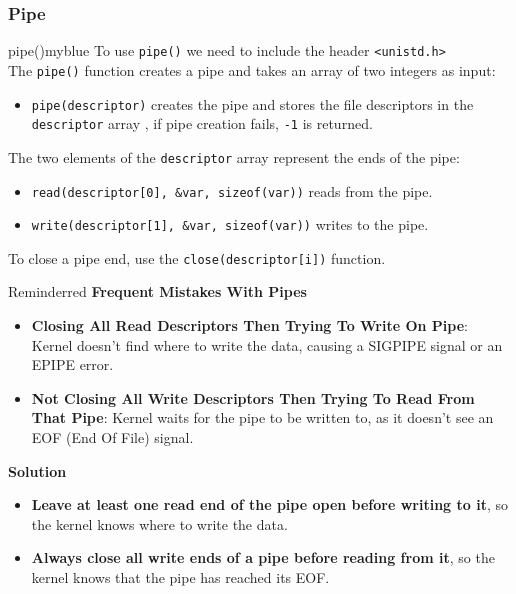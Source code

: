 \newpage
\null


\vspace{0.35cm}
\subsubsection{Pipe}
\begin{prettyBox}{pipe()}{myblue}
To use \texttt{pipe()} we need to include the header \texttt{<unistd.h>}\\
    The \texttt{pipe()} function creates a pipe and takes an array of two integers as input:
    \begin{itemize}
        \item \texttt{pipe(descriptor)} creates the pipe and stores the file descriptors in the \texttt{descriptor} array , if pipe creation fails, \texttt{-1} is returned.
    \end{itemize}
    The two elements of the \texttt{descriptor} array represent the ends of the pipe:
    \begin{itemize}
        \item \texttt{read(descriptor[0], \&var, sizeof(var))} reads from the pipe.
        \item \texttt{write(descriptor[1], \&var, sizeof(var))} writes to the pipe.
    \end{itemize}
    To close a pipe end, use the \texttt{close(descriptor[i])} function.

\end{prettyBox}


\newpage
\null

\begin{prettyBox}{Reminder}{red}
\textbf{Frequent Mistakes With Pipes}
\begin{itemize}
    \item \textbf{Closing All Read Descriptors Then Trying To Write On Pipe}: 
    Kernel doesn't find where to write the data, causing a SIGPIPE signal or an EPIPE error.
    \item \textbf{Not Closing All Write Descriptors Then Trying To Read From That Pipe}: 
    Kernel waits for the pipe to be written to, as it doesn't see an EOF (End Of File) signal.
\end{itemize}

\textbf{Solution}
\begin{itemize}
    \item \textbf{Leave at least one read end of the pipe open before writing to it}, 
    so the kernel knows where to write the data.
    \item \textbf{Always close all write ends of a pipe before reading from it}, 
    so the kernel knows that the pipe has reached its EOF.
\end{itemize}

\end{prettyBox}



